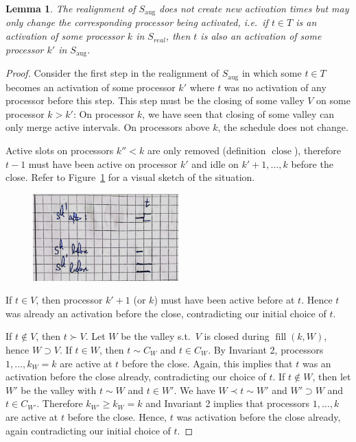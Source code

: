 \documentclass[a4paper]{article}
\DeclareMathOperator{\aug}{aug}
\DeclareMathOperator{\fillop}{fill}
\DeclareMathOperator{\close}{close}
\newtheorem{lemma}[theorem]{Lemma}
\begin{document}
\begin{lemma}\label{lemma:activations}
  The realignment of $S_{\aug}$ does not create new activation times but may only change the corresponding processor being activated, i.e.\ if $t \in T$ is an activation of some processor $k$ in $S_{real}$, then $t$ is also an activation of some processor $k'$ in $S_{\aug}$.
\end{lemma}
\begin{proof}
  Consider the first step in the realignment of $S_{\aug}$ in which some $t \in T$ becomes an activation of some processor $k'$ where $t$ was no activation of any processor before this step.
  This step must be the closing of some valley $V$ on some processor $k > k'$:
  On processor $k$, we have seen that closing of some valley can only merge active intervals.
  On processors above $k$, the schedule does not change.

  Active slots on processors $k'' < k$ are only removed (definition $\close$), therefore $t-1$ must have been active on processor $k'$ and idle on $k' + 1, \ldots, k$ before the close.
  Refer to Figure~\ref{fig:activations} for a visual sketch of the situation.

  \begin{figure}[H]
    \centering
    \includegraphics[width=0.5\textwidth]{graphics/sketches/activations.png}\label{fig:activations}
    \caption{}
  \end{figure}

  If $t \in V$, then processor $k' + 1$ (or $k$) must have been active before at $t$.
  Hence $t$ was already an activation before the close, contradicting our initial choice of $t$.

  If $t \notin V$, then $t \succ V$.
  Let $W$ be the valley s.t.\ $V$ is closed during $\fillop(k, W)$, hence $W \supset V$.
  If $t \in W$, then $t \sim C_W$ and $t \in C_W$.
  By Invariant 2, processors $1, \ldots, k_W = k$ are active at $t$ before the close.
  Again, this implies that $t$ was an activation before the close already, contradicting our choice of $t$.
  If $t \notin W$, then let $W'$ be the valley with $t \sim W$ and $t \in W'$.
  We have $W \prec t \sim W'$ and $W' \supset W$ and $t \in C_{W'}$.
  Therefore $k_{W'} \geq k_W = k$ and Invariant 2 implies that processors $1, \ldots, k$ are active at $t$ before the close.
  Hence, $t$ was activation before the close already, again contradicting our initial choice of $t$.
\end{proof}
\end{document}
